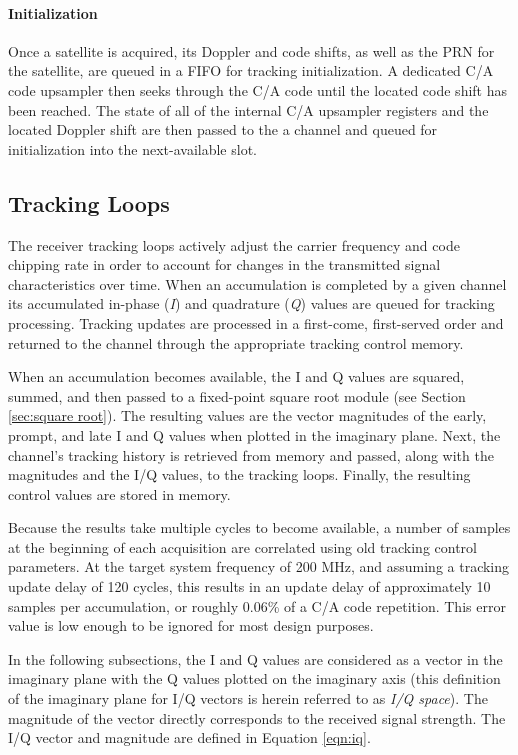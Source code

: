 \documentclass[12pt]{article}
\begin{document}
\paragraph{Initialization}
Once a satellite is acquired, its Doppler and code shifts, as well as the PRN for the satellite, are queued in a FIFO for tracking initialization. A dedicated C/A code upsampler then seeks through the C/A code until the located code shift has been reached. The state of all of the internal C/A upsampler registers and the located Doppler shift are then passed to the a channel and queued for initialization into the next-available slot.

\subsection{Tracking Loops}
\label{sec:tracking loops}
The receiver tracking loops actively adjust the carrier frequency and code chipping rate in order to account for changes in the transmitted signal characteristics over time. When an accumulation is completed by a given channel its accumulated in-phase (\emph{I}) and quadrature (\emph{Q}) values are queued for tracking processing. Tracking updates are processed in a first-come, first-served order and returned to the channel through the appropriate tracking control memory.

When an accumulation becomes available, the I and Q values are squared, summed, and then passed to a fixed-point square root module (see Section \ref{sec:square root}). The resulting values are the vector magnitudes of the early, prompt, and late I and Q values when plotted in the imaginary plane. Next, the channel's tracking history is retrieved from memory and passed, along with the magnitudes and the I/Q values, to the tracking loops. Finally, the resulting control values are stored in memory.

Because the results take multiple cycles to become available, a number of samples at the beginning of each acquisition are correlated using old tracking control parameters. At the target system frequency of 200 MHz, and assuming a tracking update delay of 120 cycles, this results in an update delay of approximately 10 samples per accumulation, or roughly 0.06\% of a C/A code repetition. This error value is low enough to be ignored for most design purposes.

In the following subsections, the I and Q values are considered as a vector in the imaginary plane with the Q values plotted on the imaginary axis (this definition of the imaginary plane for I/Q vectors is herein referred to as \emph{I/Q space}). The magnitude of the vector directly corresponds to the received signal strength. The I/Q vector and magnitude are defined in Equation \ref{eqn:iq}.
\end{document}
